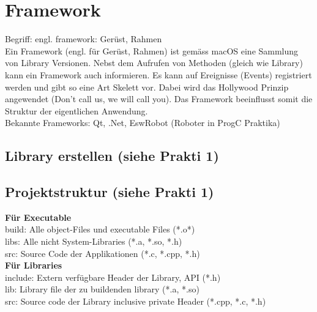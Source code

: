 \section{Framework}
Begriff: engl. framework: Gerüst, Rahmen \\
Ein Framework (engl. für Gerüst, Rahmen) ist gemäss macOS eine Sammlung von Library Versionen. Nebst dem Aufrufen von Methoden (gleich wie  Library) kann ein Framework auch informieren. Es kann auf Ereignisse (Events) registriert werden und gibt so eine Art Skelett vor. Dabei wird das Hollywood Prinzip angewendet (Don't call us, we will call you).
Das Framework beeinflusst somit die Struktur der eigentlichen Anwendung. \\
Bekannte Frameworks: Qt, .Net, EswRobot (Roboter in ProgC Praktika)

\subsection{Library erstellen (siehe Prakti 1)}
 
 
\subsection{Projektstruktur  (siehe Prakti 1)}
\textbf{Für Executable} \\
build: Alle object-Files und executable Files (*.o*) \\
libs: Alle nicht System-Libraries (*.a, *.so, *.h) \\
src: Source Code der Applikationen (*.c, *.cpp, *.h) \\

\textbf{Für Libraries} \\
include: Extern verfügbare Header der Library, API (*.h) \\
lib: Library file der zu buildenden library (*.a, *.so) \\
src: Source code der Library inclusive private Header (*.cpp, *.c, *.h)


